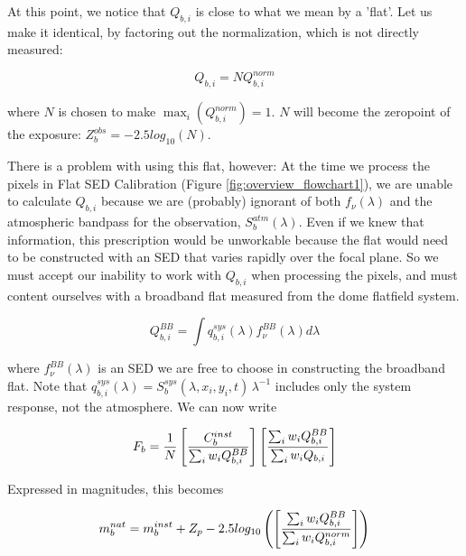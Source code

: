 \documentclass[12pt,preprint]{aastex}
\begin{document}
At this point, we notice that $Q_{b,i}$ is close to what we mean by a 'flat'.  Let us make it identical, by factoring out 
the normalization, which is not directly measured:

\begin{equation}
Q_{b,i} = N Q_{b,i}^{norm}
\end{equation}

where $N$ is chosen to make $\max_i(Q_{b,i}^{norm}) = 1$.  $N$ will become the zeropoint of the exposure:
$Z_b^{obs} = -2.5 log_{10}(N)$.

There is a problem with using this flat, however:  At the time we process the pixels
in Flat SED Calibration (Figure \ref{fig:overview_flowchart1}), we are unable to calculate $Q_{b,i}$ because we are (probably) ignorant
of both $f_\nu(\lambda)$ and the atmospheric bandpass for the observation, $S_b^{atm}(\lambda)$.  Even if we knew that information, 
this prescription would be unworkable because the flat would need to be constructed with an SED 
that varies rapidly over the focal plane.   So we must accept our inability to work with $Q_{b,i}$ when processing the pixels, and must
content ourselves with a broadband flat measured from the dome flatfield system.

\begin{equation}
Q_{b,i}^{BB} = \int {q_{b,i}^{sys}(\lambda) f_\nu^{BB}(\lambda) d\lambda}
\end{equation}

\noindent
where $f_\nu^{BB}(\lambda)$ is an SED we are free to choose in constructing the broadband flat. Note that 
$q_{b,i}^{sys}(\lambda)=S_b^{sys}(\lambda,x_i,y_i,t) \, \lambda^{-1}$ 
includes only the system response, not the atmosphere.  We can now write

\begin{equation}
F_b = {1 \over N} \left[ {C_b^{inst} \over {\sum_i{w_i Q_{b,i}^{BB}}}}\right]  \left[ {\sum_i {w_i Q_{b,i}^{BB} }} \over {\sum_i {w_i Q_{b,i} }}\right]
\end{equation}

\noindent
Expressed in magnitudes, this becomes

\begin{equation}
m_b^{nat} = m_b^{inst} + Z_p - 2.5 log_{10} \left( \left[ {\sum_i {w_i Q_{b,i}^{BB} }} \over {\sum_i {w_i Q_{b,i}^{norm} }}\right] \right)
\end{equation}
\end{document}
